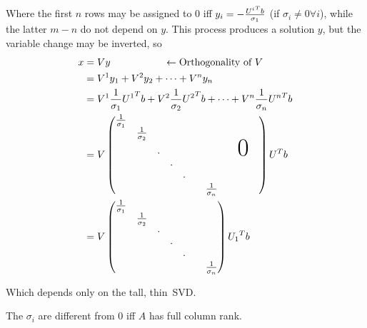 \documentclass[ComputationalMathematics.tex]{subfiles}
\begin{document}
Where the first $n$ rows may be assigned to $0$ iff $y_{i} = -\frac{{U^{i}}^{T} b}{\sigma_{1}}$ (if $\sigma_i \neq 0 \forall i$), while the latter $m-n$ do not depend on $y$. This process produces a solution $y$, but the variable change may be inverted, so 
\begin{equation}
  \begin{aligned}
    x &= Vy ~~~~~~~~~~~~~~~~ \leftarrow \text{Orthogonality of} ~V\\
    &= V^1 y_1 + V^2 y_2+ \cdots + V^n y_n\\
    &= V^1 \frac{1}{\sigma_1} \tr{U^1} b + V^2 \frac{1}{\sigma_2} \tr{U^2} b + \cdots + V^n \frac{1}{\sigma_n} \tr{U^n} b\\ 
    &= {V \begin{pmatrix}
      \frac{1}{\sigma_{1}} & & & & &&&&\\
        & \frac{1}{\sigma_{2}} & & & &&&&\\
        & & \cdot & & & &&&\text{\Huge 0}\\
        & & & \cdot & &&&&\\
        & & & & \cdot &&&&&\\
        & & & & & & \frac{1}{\sigma_{n}}&&&\\
    \end{pmatrix} \tr{U} b}\\
    &= {V \begin{pmatrix}
      \frac{1}{\sigma_{1}} & & & &\\
        & \frac{1}{\sigma_{2}} & & &\\
        & & \cdot & & &\\
        & & & \cdot & &\\
        & & & & \cdot &\\
        & & & & & & \frac{1}{\sigma_{n}}\\
    \end{pmatrix} \tr{U_1} b}\\
  \end{aligned}
\end{equation}

Which depends only on the tall, thin~SVD.%
\begin{proposition}
  The $\sigma_{i}$ are different from $0$ iff $A$ has full column rank.
\end{proposition}
\end{document}
